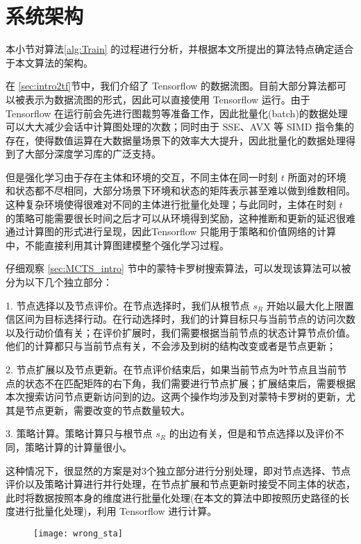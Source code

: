 \section{系统架构}
本小节对算法\ref{alg:Train} 的过程进行分析，并根据本文所提出的算法特点确定适合于本文算法的架构。

在 \ref{sec:intro2tf}节中，我们介绍了 Tensorflow 的数据流图。目前大部分算法都可以被表示为数据流图的形式，因此可以直接使用 Tensorflow 运行。由于 Tensorflow 在运行前会先进行图裁剪等准备工作，因此批量化(batch)的数据处理可以大大减少会话中计算图处理的次数；同时由于 SSE、AVX 等 SIMD 指令集的存在，使得数值运算在大数据量场景下的效率大大提升，因此批量化的数据处理得到了大部分深度学习库的广泛支持。

但是强化学习由于存在主体和环境的交互，不同主体在同一时刻 $t$ 所面对的环境和状态都不尽相同，大部分场景下环境和状态的矩阵表示甚至难以做到维数相同。这种复杂环境使得很难对不同的主体进行批量化处理；与此同时，主体在时刻 $t$ 的策略可能需要很长时间之后才可以从环境得到奖励，这种推断和更新的延迟很难通过计算图的形式进行呈现，因此Tensorflow 只能用于策略和价值网络的计算中，不能直接利用其计算图建模整个强化学习过程。

仔细观察 \ref{sec:MCTS_intro} 节中的蒙特卡罗树搜索算法，可以发现该算法可以被分为以下几个独立部分：

1. 节点选择以及节点评价。在节点选择时，我们从根节点 $s_R$ 开始以最大化上限置信区间为目标选择行动。在行动选择时，我们的计算目标只与当前节点的访问次数以及行动价值有关；在评价扩展时，我们需要根据当前节点的状态计算节点价值。他们的计算都只与当前节点有关，不会涉及到树的结构改变或者是节点更新；

2. 节点扩展以及节点更新。在节点评价结束后，如果当前节点为叶节点且当前节点的状态不在匹配矩阵的右下角，我们需要进行节点扩展；扩展结束后，需要根据本次搜索访问节点更新访问到的边。这两个操作均涉及到对蒙特卡罗树的更新，尤其是节点更新，需要改变的节点数量较大。

3. 策略计算。策略计算只与根节点 $s_R$ 的出边有关，但是和节点选择以及评价不同，策略计算的计算量很小。

这种情况下，很显然的方案是对3个独立部分进行分别处理，即对节点选择、节点评价以及策略计算进行并行处理，在节点扩展和节点更新时接受不同主体的状态，此时将数据按照本身的维度进行批量化处理(在本文的算法中即按照历史路径的长度进行批量化处理)，利用 Tensorflow 进行计算。

\begin{figure}[!htbp]
    \centering
    \texttt{[image: wrong\_sta]}
    \label{fig:tensorflow_dep}
\end{figure}

